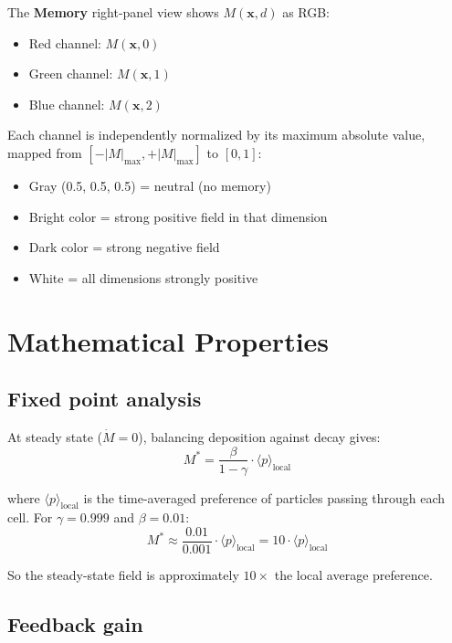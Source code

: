 \documentclass[11pt,a4paper]{article}
\begin{document}
The \textbf{Memory} right-panel view shows $M(\mathbf{x}, d)$ as RGB:
\begin{itemize}[nosep]
\item Red channel: $M(\mathbf{x}, 0)$
\item Green channel: $M(\mathbf{x}, 1)$
\item Blue channel: $M(\mathbf{x}, 2)$
\end{itemize}

Each channel is independently normalized by its maximum absolute value, mapped from $[-|M|_{\max}, +|M|_{\max}]$ to $[0, 1]$:
\begin{itemize}[nosep]
\item Gray (0.5, 0.5, 0.5) = neutral (no memory)
\item Bright color = strong positive field in that dimension
\item Dark color = strong negative field
\item White = all dimensions strongly positive
\end{itemize}

\section{Mathematical Properties}

\subsection{Fixed point analysis}

At steady state ($\dot{M} = 0$), balancing deposition against decay gives:
\begin{equation}
M^* = \frac{\beta}{1 - \gamma} \cdot \langle p \rangle_{\mathrm{local}}
\end{equation}

where $\langle p \rangle_{\mathrm{local}}$ is the time-averaged preference of particles passing through each cell. For $\gamma = 0.999$ and $\beta = 0.01$:
\begin{equation}
M^* \approx \frac{0.01}{0.001} \cdot \langle p \rangle_{\mathrm{local}} = 10 \cdot \langle p \rangle_{\mathrm{local}}
\end{equation}

So the steady-state field is approximately $10\times$ the local average preference.

\subsection{Feedback gain}
\end{document}
